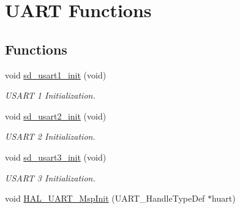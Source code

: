 \hypertarget{group___s_d___u_a_r_t___functions}{}\section{U\+A\+RT Functions}
\label{group___s_d___u_a_r_t___functions}
\subsection*{Functions}
\begin{DoxyCompactItemize}
\item 
\mbox{\label{group___s_d___u_a_r_t___functions_ga3c068b8d65ff8482fa0661fc5ef58da0}} 
void \mbox{\hyperlink{group___s_d___u_a_r_t___functions_ga3c068b8d65ff8482fa0661fc5ef58da0}{sd\+\_\+usart1\+\_\+init}} (void)
\begin{DoxyCompactList}\small\item\em U\+S\+A\+RT 1 Initialization. \end{DoxyCompactList}\item 
\mbox{\label{group___s_d___u_a_r_t___functions_gaa39e30aeb0d6ed7754ed9ce3b76d522c}} 
void \mbox{\hyperlink{group___s_d___u_a_r_t___functions_gaa39e30aeb0d6ed7754ed9ce3b76d522c}{sd\+\_\+usart2\+\_\+init}} (void)
\begin{DoxyCompactList}\small\item\em U\+S\+A\+RT 2 Initialization. \end{DoxyCompactList}\item 
\mbox{\label{group___s_d___u_a_r_t___functions_ga33ad79f8c02f0f479691fac6dd696051}} 
void \mbox{\hyperlink{group___s_d___u_a_r_t___functions_ga33ad79f8c02f0f479691fac6dd696051}{sd\+\_\+usart3\+\_\+init}} (void)
\begin{DoxyCompactList}\small\item\em U\+S\+A\+RT 3 Initialization. \end{DoxyCompactList}\item 
void \mbox{\hyperlink{group___s_d___u_a_r_t___functions_ga0e553b32211877322f949b14801bbfa7}{H\+A\+L\+\_\+\+U\+A\+R\+T\+\_\+\+Msp\+Init}} (U\+A\+R\+T\+\_\+\+Handle\+Type\+Def $\ast$huart)
\item 
\mbox{\label{group___s_d___u_a_r_t___functions_ga718f39804e3b910d738a0e1e46151188}} 

\end{DoxyCompactItemize}
